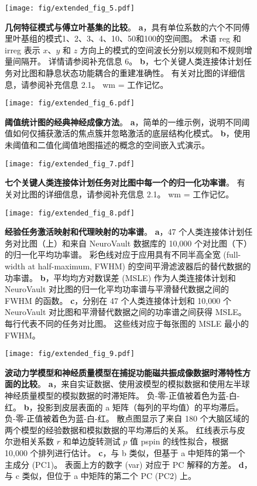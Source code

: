 \documentclass[lang=cn,a4paper,newtx]{elegantpaper}
\begin{document}
\begin{figure}[!htb] 
	\centering
	\texttt{[image: fig/extended\_fig\_5.pdf]}
	\caption{\textbf{几何特征模式与傅立叶基集的比较}。
	\textbf{a}，具有单位系数的六个不同傅里叶基组的模式1、2、3、4、10、50和100的空间图。
	术语 reg 和 irreg 表示 $ x $、$ y $ 和 $ z $ 方向上的模式的空间波长分别以规则和不规则增量间隔开。
	详情请参阅补充信息 6。
	\textbf{b}，七个关键人类连接体计划任务对比图和静息状态功能耦合的重建准确性。
	有关对比图的详细信息，请参阅补充信息 2.1。
	wm = 工作记忆。}
	\label{fig:extended_fig_5}
\end{figure}


\begin{figure}[!htb] 
	\centering
	\texttt{[image: fig/extended\_fig\_6.pdf]}
	\caption{\textbf{阈值统计图的经典神经成像方法}。
	\textbf{a}，简单的一维示例，说明不同阈值如何仅捕获激活的焦点簇并忽略激活的底层结构化模式。
	\textbf{b}，使用未阈值和二值化阈值地图描述的概念的空间嵌入式演示。}
	\label{fig:extended_fig_6}
\end{figure}


\begin{figure}[!htb] 
	\centering
	\texttt{[image: fig/extended\_fig\_7.pdf]}
	\caption{\textbf{七个关键人类连接体计划任务对比图中每一个的归一化功率谱}。
	有关对比图的详细信息，请参阅补充信息 2.1。
	wm = 工作记忆。}
	\label{fig:extended_fig_7}
\end{figure}


\begin{figure}[!htb] 
	\centering
	\texttt{[image: fig/extended\_fig\_8.pdf]}
	\caption{\textbf{经验任务激活映射和代理映射的功率谱}。
	\textbf{a}，47 个人类连接体计划任务对比图（上）和来自 NeuroVault 数据库的 10,000 个对比图（下）的归一化平均功率谱。
	彩色线对应于应用具有不同半高全宽 (full-width at
	half-maximum, FWHM) 的空间平滑滤波器后的替代数据的功率谱。
	\textbf{b}，平均均方对数误差 (MSLE) 作为人类连接体计划和 NeuroVault 对比图的归一化平均功率谱与平滑替代数据之间的 FWHM 的函数。
	\textbf{c}，分别在 47 个人类连接体计划和 10,000 个 NeuroVault 对比图和平滑替代数据之间的功率谱之间获得 MSLE。
	每行代表不同的任务对比图。
	这些线对应于每张图的 MSLE 最小的 FWHM。}
	\label{fig:extended_fig_8}
\end{figure}


\begin{figure}[!htb] 
	\centering
	\texttt{[image: fig/extended\_fig\_9.pdf]}
	\caption{\textbf{波动力学模型和神经质量模型在捕捉功能磁共振成像数据时滞特性方面的比较}。
	\textbf{a}，来自实证数据、使用波模型的模拟数据和使用左半球神经质量模型的模拟数据的时滞矩阵。
	负-零-正值被着色为蓝-白-红。
	\textbf{b}，投影到皮层表面的 a 矩阵（每列的平均值）的平均滞后。
	负-零-正值被着色为蓝-白-红。
	散点图显示了来自 180 个大脑区域的两个模型的经验数据和模拟数据的平均滞后的关系。
	红线表示与皮尔逊相关系数 $ r $ 和单边旋转测试 $ p $ 值 pspin 的线性拟合，根据 10,000 个排列进行估计。 
	\textbf{c}，与 b 类似，但基于 a 中矩阵的第一个主成分 (PC1)。
	表面上方的数字 (var) 对应于 PC 解释的方差。
	\textbf{d}，与 c 类似，但位于 a 中矩阵的第二个 PC (PC2) 上。}
	\label{fig:extended_fig_9}
\end{figure}
\end{document}
